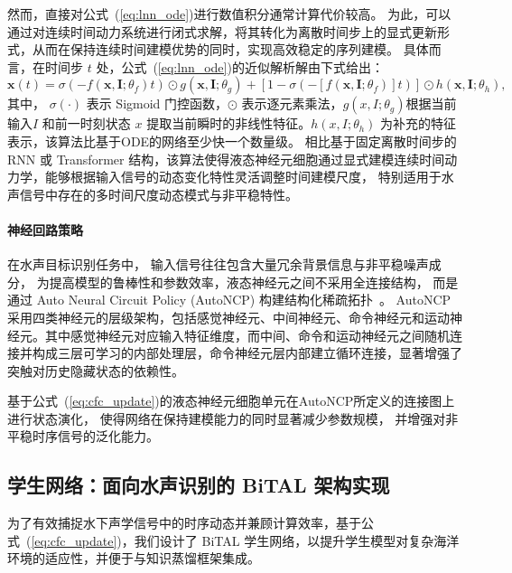 \documentclass[a4paper, 12pt]{article}
\begin{document}
然而，直接对公式~(\ref{eq:lnn_ode})进行数值积分通常计算代价较高。
为此，可以通过对连续时间动力系统进行闭式求解，将其转化为离散时间步上的显式更新形式，从而在保持连续时间建模优势的同时，实现高效稳定的序列建模。
具体而言，在时间步 $t$ 处，公式~(\ref{eq:lnn_ode})的近似解析解由下式给出：
\begin{equation}
\mathbf{x}(t) = \sigma\left(-f(\mathbf{x}, \mathbf{I}; \theta_f) t\right) \odot g(\mathbf{x}, \mathbf{I}; \theta_g) + \left[1 - \sigma\left(-\left[f(\mathbf{x}, \mathbf{I}; \theta_f)\right] t\right)\right] \odot h(\mathbf{x}, \mathbf{I}; \theta_h)
,
\label{eq:cfc_update}
\end{equation}
其中，
$\sigma(\cdot)$ 表示 Sigmoid 门控函数，$\odot$ 表示逐元素乘法，$g(x, I; \theta_g)$根据当前输入$I$ 和前一时刻状态 $x$ 提取当前瞬时的非线性特征。$h(x, I; \theta_h)$ 为补充的特征表示，该算法比基于ODE的网络至少快一个数量级。
相比基于固定离散时间步的 RNN 或 Transformer 结构，该算法使得液态神经元细胞通过显式建模连续时间动力学，能够根据输入信号的动态变化特性灵活调整时间建模尺度，
特别适用于水声信号中存在的多时间尺度动态模式与非平稳特性。
\paragraph{神经回路策略}
在水声目标识别任务中，
输入信号往往包含大量冗余背景信息与非平稳噪声成分，
为提高模型的鲁棒性和参数效率，液态神经元之间不采用全连接结构，
而是通过 Auto Neural Circuit Policy (AutoNCP) 构建结构化稀疏拓扑~\cite{Lechner2020NCP}。
AutoNCP 采用四类神经元的层级架构，包括感觉神经元、中间神经元、命令神经元和运动神经元。其中感觉神经元对应输入特征维度，而中间、命令和运动神经元之间随机连接并构成三层可学习的内部处理层，命令神经元层内部建立循环连接，显著增强了突触对历史隐藏状态的依赖性。

基于公式~(\ref{eq:cfc_update})的液态神经元细胞单元在AutoNCP所定义的连接图上进行状态演化，
使得网络在保持建模能力的同时显著减少参数规模，
并增强对非平稳时序信号的泛化能力。
\subsection{学生网络：面向水声识别的 BiTAL 架构实现}
为了有效捕捉水下声学信号中的时序动态并兼顾计算效率，基于公式~(\ref{eq:cfc_update})，我们设计了 BiTAL 学生网络，以提升学生模型对复杂海洋环境的适应性，并便于与知识蒸馏框架集成。
\end{document}
